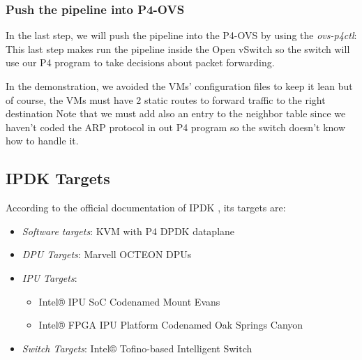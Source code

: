 \documentclass[../sn.tex]{subfiles}
\begin{document}
\subsubsection*{Push the pipeline into P4-OVS}
In the last step, we will push the pipeline into the P4-OVS by using the \emph{ovs-p4ctl}:
This last step makes run the pipeline inside the Open vSwitch so the switch will use our P4 program to take decisions about packet forwarding.

In the demonstration, we avoided the VMs' configuration files to keep it lean but of course, the VMs must have 2 static routes to forward traffic to the right destination
Note that we must add also an entry to the neighbor table since we haven't coded the ARP protocol in out P4 program so the switch doesn't know how to handle it.

\subsection{IPDK Targets}
According to the official documentation of IPDK \cite{ipdk}, its targets are: 

\begin{itemize}
    \item \textit{Software targets}: KVM with P4 DPDK dataplane
    \item \textit{DPU Targets}: Marvell OCTEON DPUs
    \item \textit{IPU Targets}: \begin{itemize}
                                    \item Intel® IPU SoC Codenamed Mount Evans
                                    \item Intel® FPGA IPU Platform Codenamed Oak Springs Canyon
                                \end{itemize}
    \item \textit{Switch Targets}: Intel® Tofino-based Intelligent Switch
\end{itemize}

\clearpage
\end{document}
